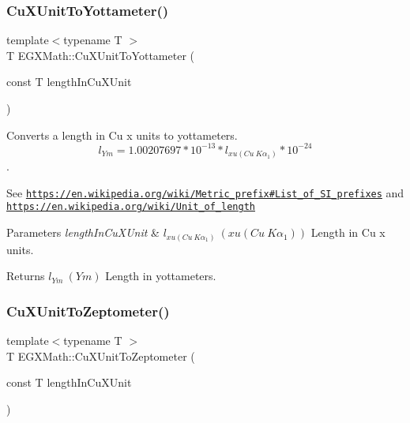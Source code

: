 \subsubsection{\texorpdfstring{Cu\+X\+Unit\+To\+Yottameter()}{CuXUnitToYottameter()}}
{\footnotesize\ttfamily template$<$typename T $>$ \\
T E\+G\+X\+Math\+::\+Cu\+X\+Unit\+To\+Yottameter (\begin{DoxyParamCaption}\item[{const T}]{length\+In\+Cu\+X\+Unit }\end{DoxyParamCaption})}



Converts a length in Cu x units to yottameters. \[ l_{Ym}=1.00207697*10^{-13} * l_{xu(Cu\ K\alpha_1)} * 10^{-24} \]. 

See \href{https://en.wikipedia.org/wiki/Metric_prefix#List_of_SI_prefixes}{\tt https\+://en.\+wikipedia.\+org/wiki/\+Metric\+\_\+prefix\#\+List\+\_\+of\+\_\+\+S\+I\+\_\+prefixes} and \href{https://en.wikipedia.org/wiki/Unit_of_length}{\tt https\+://en.\+wikipedia.\+org/wiki/\+Unit\+\_\+of\+\_\+length} 
\begin{DoxyParams}{Parameters}
{\em length\+In\+Cu\+X\+Unit} & $ l_{xu(Cu\ K\alpha_1)}\ (xu(Cu\ K\alpha_1))$ Length in Cu x units. \\
\hline
\end{DoxyParams}
\begin{DoxyReturn}{Returns}
$ l_{Ym}\ (Ym)$ Length in yottameters. 
\end{DoxyReturn}
\mbox{\label{group___e_g_x_math-_conversions-_length_conversions-_non-_s_i-_cu_x_unit-_s_i_gaa35b226ca82bd0d4389aaae81e5b385e}} 
\subsubsection{\texorpdfstring{Cu\+X\+Unit\+To\+Zeptometer()}{CuXUnitToZeptometer()}}
{\footnotesize\ttfamily template$<$typename T $>$ \\
T E\+G\+X\+Math\+::\+Cu\+X\+Unit\+To\+Zeptometer (\begin{DoxyParamCaption}\item[{const T}]{length\+In\+Cu\+X\+Unit }\end{DoxyParamCaption})}



